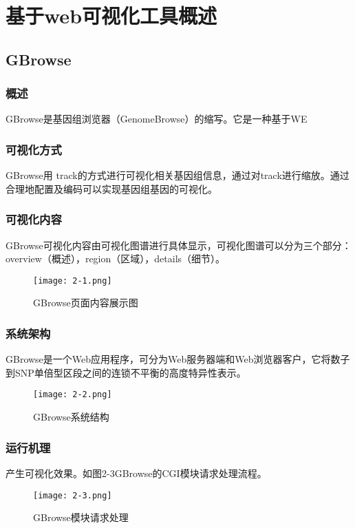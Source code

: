 \chapter{基于web可视化工具概述}
	\section{GBrowse}
		\subsection{概述}
		GBrowse是基因组浏览器（GenomeBrowse）的缩写。它是一种基于WE
		\subsection{可视化方式}
		GBrowse用 track的方式进行可视化相关基因组信息，通过对track进行缩放。通过合理地配置及编码可以实现基因组基因的可视化。
	
		\subsection{可视化内容}
		GBrowse可视化内容由可视化图谱进行具体显示，可视化图谱可以分为三个部分：overview（概述），region（区域），details（细节）。
		\begin{itemize}
		
		\end{itemize}

		\begin{figure}
			\centering
			\texttt{[image: 2-1.png]}
			\caption{GBrowse页面内容展示图}
		\end{figure}	
		\subsection{系统架构}
		GBrowse是一个Web应用程序，可分为Web服务器端和Web浏览器客户，它将数子到SNP单倍型区段之间的连锁不平衡的高度特异性表示。
		\begin{figure}[!ht]
			\centering
			\texttt{[image: 2-2.png]}
			\caption{GBrowse系统结构}
		\end{figure}
		\subsection{运行机理}
产生可视化效果。如图2-3GBrowse的CGI模块请求处理流程。
			\begin{figure}[!ht]
				\centering
				\texttt{[image: 2-3.png]}
				\caption{GBrowse模块请求处理}
			\end{figure}
